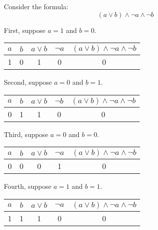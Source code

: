 \documentclass[12pt,a4paper,openany]{article}
\begin{document}
Consider the formula:
$$ (a \lor b) \land \neg a \land \neg b $$

First, suppose $a = 1$ and $b = 0$.

\begin{center}
\begin{tabular}{|c|c|c|c|c|}
\hline
$a$ & $b$ & $a \lor b$ & $\neg a$ & $(a \lor b) \land \neg a \land \neg b$ \\
\hline
\textcolor{truecolor}{1} & \textcolor{falsecolor}{0} & \textcolor{truecolor}{1} & \textcolor{falsecolor}{0} & \textcolor{falsecolor}{0} \\
\hline
\end{tabular}
\end{center}

Second, suppose $a = 0$ and $b = 1$.

\begin{center}
\begin{tabular}{|c|c|c|c|c|}
\hline
$a$ & $b$ & $a \lor b$ & $\neg b$ & $(a \lor b) \land \neg a \land \neg b$ \\
\hline
\textcolor{falsecolor}{0} & \textcolor{truecolor}{1} & \textcolor{truecolor}{1} & \textcolor{falsecolor}{0} & \textcolor{falsecolor}{0} \\
\hline
\end{tabular}
\end{center}

Third, suppose $a = 0$ and $b = 0$.

\begin{center}
\begin{tabular}{|c|c|c|c|c|}
\hline
$a$ & $b$ & $a \lor b$ & $\neg a$ & $(a \lor b) \land \neg a \land \neg b$ \\
\hline
\textcolor{falsecolor}{0} & \textcolor{falsecolor}{0} & \textcolor{falsecolor}{0} & \textcolor{truecolor}{1} & \textcolor{falsecolor}{0} \\
\hline
\end{tabular}
\end{center}

Fourth, suppose $a = 1$ and $b = 1$.

\begin{center}
\begin{tabular}{|c|c|c|c|c|}
\hline
$a$ & $b$ & $a \lor b$ & $\neg a$ & $(a \lor b) \land \neg a \land \neg b$ \\
\hline
\textcolor{truecolor}{1} & \textcolor{truecolor}{1} & \textcolor{truecolor}{1} & \textcolor{falsecolor}{0} & \textcolor{falsecolor}{0} \\
\hline
\end{tabular}
\end{center}
\end{document}
